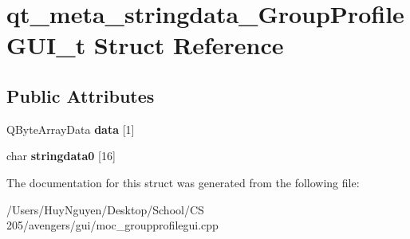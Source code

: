 \hypertarget{structqt__meta__stringdata__GroupProfileGUI__t}{}\section{qt\+\_\+meta\+\_\+stringdata\+\_\+\+Group\+Profile\+G\+U\+I\+\_\+t Struct Reference}
\label{structqt__meta__stringdata__GroupProfileGUI__t}
\subsection*{Public Attributes}
\begin{DoxyCompactItemize}
\item 
Q\+Byte\+Array\+Data {\bfseries data} \mbox{[}1\mbox{]}\hypertarget{structqt__meta__stringdata__GroupProfileGUI__t_ab9982eba2e4eaf1297d665a8d04f3c4e}{}\label{structqt__meta__stringdata__GroupProfileGUI__t_ab9982eba2e4eaf1297d665a8d04f3c4e}

\item 
char {\bfseries stringdata0} \mbox{[}16\mbox{]}\hypertarget{structqt__meta__stringdata__GroupProfileGUI__t_a155da34fb8ac030da19308372a93dc96}{}\label{structqt__meta__stringdata__GroupProfileGUI__t_a155da34fb8ac030da19308372a93dc96}

\end{DoxyCompactItemize}


The documentation for this struct was generated from the following file\+:\begin{DoxyCompactItemize}
\item 
/\+Users/\+Huy\+Nguyen/\+Desktop/\+School/\+C\+S 205/avengers/gui/moc\+\_\+groupprofilegui.\+cpp\end{DoxyCompactItemize}

